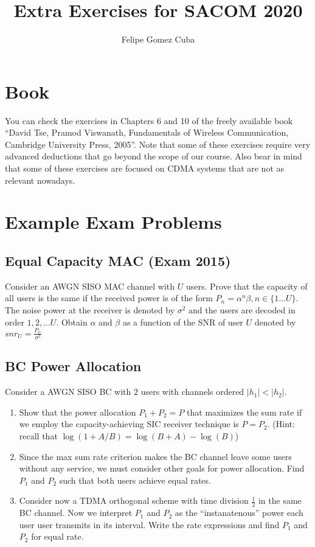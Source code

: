 \documentclass[a4paper,10pt]{article}
\title{Extra Exercises for SACOM 2020}
\author{Felipe Gomez Cuba}
\begin{document}
\section{Book}

You can check the exercises in Chapters 6 and 10 of the freely available book ``David Tse, Pramod Viswanath, Fundamentals of Wireless Communication, Cambridge University Press, 2005''. Note that some of these exercises require very advanced deductions that go beyond the scope of our course. Also bear in mind that some of these exercises are focused on CDMA systems that are not as relevant nowadays.

\section{Example Exam Problems}
\subsection{Equal Capacity MAC (Exam 2015)}

Consider an AWGN SISO MAC channel with $U$ users. Prove that the capacity of all users is the same if the received power is of the form $P_n=\alpha^n\beta, n\in\{1\dots U\}$. The noise power at the receiver is denoted by $\sigma^2$ and the users are decoded in order $1,2,\dots U$. Obtain $\alpha$ and $\beta$ as a function of the SNR of user $U$ denoted by $snr_U=\frac{P_U}{\sigma^2}$

\subsection{BC Power Allocation}

Consider a AWGN SISO BC with $2$ users with channels ordered $|h_1|<|h_2|$. 
\begin{enumerate}
 \item Show that the power allocation $P_1+P_2=P$ that maximizes the sum rate if we employ the capacity-achieving SIC receiver technique is $P=P_2$. (Hint: recall that $\log(1+A/B)=\log(B+A)-\log(B)$)
 \item Since the max sum rate criterion makes the BC channel leave some users without any service, we must consider other goals for power allocation. Find $P_1$ and $P_2$ such that both users achieve equal rates.
 \item Consider now a TDMA orthogonal scheme with time division $\frac{1}{2}$ in the same BC channel. Now we interpret $P_1$ and $P_2$ as the ``instanatenous'' power each user user transmits in its interval. Write the rate expressions and find $P_1$ and $P_2$ for equal rate.
\end{enumerate}
\end{document}

